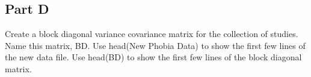 \documentclass[]{article}
\newenvironment{Shaded}{\begin{snugshade}}{\end{snugshade}}
\newcommand{\KeywordTok}[1]{\textcolor[rgb]{0.13,0.29,0.53}{\textbf{#1}}}
\newcommand{\StringTok}[1]{\textcolor[rgb]{0.31,0.60,0.02}{#1}}
\newcommand{\OperatorTok}[1]{\textcolor[rgb]{0.81,0.36,0.00}{\textbf{#1}}}
\newcommand{\NormalTok}[1]{#1}
\begin{document}
\subsection{Part D}\label{part-d}

Create a block diagonal variance covariance matrix for the collection of
studies. Name this matrix, BD. Use head(New Phobia Data) to show the
first few lines of the new data file. Use head(BD) to show the first few
lines of the block diagonal matrix.

\begin{Shaded}
\end{Shaded}
\end{document}
